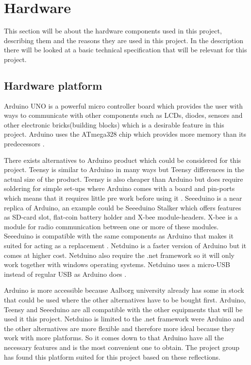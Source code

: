 

\section{Hardware}
This section will be about the hardware components used in this project, describing them and the reasons they are used in this project. In the description there will be looked at a basic technical specification that will be relevant for this project.

\subsection{Hardware platform}
\label{sec:hardwarearduino}
Arduino UNO is a powerful micro controller board which provides the user with ways to communicate with other components such as LCDs, diodes, sensors and other electronic bricks(building blocks) which is a desirable feature in this project. Arduino uses the ATmega328 chip which provides more memory than its predecessors \citep{ArduinoUno}.

There exists alternatives to Arduino product which could be considered for this project. Teensy is similar to Arduino in many ways but Teensy differences in the actual size of the product. Teensy is also cheaper than Arduino but does require soldering for simple set-ups where Arduino comes with a board and pin-ports which means that it requires little pre work before using it \citep{Teensy}.
Seeeduino is a near replica of Arduino, an example could be Seeeduino Stalker which offers features as SD-card slot, flat-coin battery holder and X-bee module-headers. X-bee is a module for radio communication between one or more of these modules. Seeeduino is compatible with the same components as 
Arduino that makes it suited for acting as a replacement \citep{Seedui}.
Netduino is a faster version of Arduino but it comes at higher cost. Netduino also require the .net framework so it will only work together with windows operating systems. Netduino uses a micro-USB instead of regular USB as Arduino does \citep{Netdui}.

Arduino is more accessible because Aalborg university already has some in stock that could be used where the other alternatives have to be bought first. Arduino, Teensy and Seeeduino are all compatible with the other equipments that will be used it this project. Netduino is limited to the .net framework were Arduino and the other alternatives are more flexible and therefore more ideal because they work with more platforms.
So it comes down to that Arduino have all the necessary features and is the most convenient one to obtain. The project group has found this platform suited for this project based on these reflections. 

